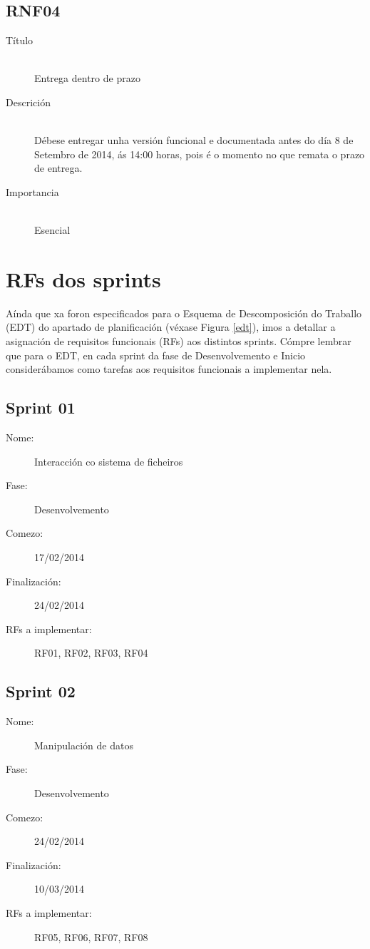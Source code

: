 \subsection*{RNF04}
\begin{description}
\item[Título] \hfill \\
Entrega dentro de prazo
\item[Descrición] \hfill \\
Débese entregar unha versión funcional e documentada antes do día 8 de Setembro de 2014, ás 14:00 horas, pois é o momento no que remata o prazo de entrega.
\item[Importancia] \hfill \\
Esencial
\end{description}

\section{RFs dos sprints}

Aínda que xa foron especificados para o Esquema de Descomposición do Traballo (EDT) do apartado de planificación (véxase Figura \ref{edt}), imos a detallar a asignación de requisitos funcionais (RFs) aos distintos sprints. Cómpre lembrar que para o EDT, en cada sprint da fase de Desenvolvemento e Inicio considerábamos como tarefas aos requisitos funcionais a implementar nela.

\subsection*{Sprint 01}
\begin{description}
\item[Nome:] Interacción co sistema de ficheiros
\item[Fase:] Desenvolvemento
\item[Comezo:] 17/02/2014
\item[Finalización:] 24/02/2014
\item[RFs a implementar:] RF01, RF02, RF03, RF04
\end{description}

\subsection*{Sprint 02}
\begin{description}
\item[Nome:] Manipulación de datos
\item[Fase:] Desenvolvemento
\item[Comezo:] 24/02/2014
\item[Finalización:] 10/03/2014
\item[RFs a implementar:] RF05, RF06, RF07, RF08
\end{description}

